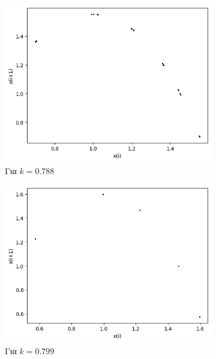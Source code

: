 \begin{figure}[ht]
	\centering
	\begin{subfigure}[b]{0.4\textwidth}
		\centering
		\includegraphics[width=\textwidth]{LateX images/graphs q16/g17}
		\caption{Για $k=0.788$}
		\label{f:k88}
	\end{subfigure}
	\hfill
	\begin{subfigure}[b]{0.4\textwidth}
		\centering
		\includegraphics[width=\textwidth]{LateX images/graphs q16/g18}
		\caption{Για $k=0.799$}
		\label{f:k89}
	\end{subfigure}
	\hfill
	\begin{subfigure}[b]{0.4\textwidth}
		\centering

\end{subfigure}
\end{figure}
